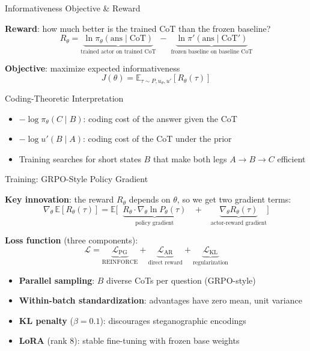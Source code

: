 \documentclass[aspectratio=169]{beamer}
\begin{document}
\begin{frame}{Informativeness Objective \& Reward}

\textbf{Reward}: how much better is the trained CoT than the frozen baseline?
\[
R_\theta = \underbrace{\ln \pi_\theta(\text{ans} \mid \text{CoT})}_{\text{trained actor on trained CoT}}
          \;-\; \underbrace{\ln \pi'(\text{ans} \mid \text{CoT}')}_{\text{frozen baseline on baseline CoT}}
\]

\textbf{Objective}: maximize expected informativeness
\[
J(\theta) = \mathbb{E}_{\tau \sim P, u_\theta, u'}[R_\theta(\tau)]
\]

\begin{block}{Coding-Theoretic Interpretation}
\begin{itemize}
    \item $-\log \pi_\theta(C \mid B)$: coding cost of the answer given the CoT
    \item $-\log u'(B \mid A)$: coding cost of the CoT under the prior
    \item Training searches for short states $B$ that make both legs $A \to B \to C$ efficient
\end{itemize}
\end{block}
\end{frame}

\begin{frame}{Training: GRPO-Style Policy Gradient}

\textbf{Key innovation}: the reward $R_\theta$ depends on $\theta$, so we get two gradient terms:
\[
\nabla_\theta\, \mathbb{E}[R_\theta(\tau)]
= \mathbb{E}\!\Big[\;\;\underbrace{R_\theta \cdot \nabla_\theta \ln P_\theta(\tau)}_{\text{policy gradient}}
  \;\;\;+\;\;\; \underbrace{\nabla_\theta R_\theta(\tau)}_{\text{actor-reward gradient}}\Big]
\]
\vspace{-0.35cm}

\textbf{Loss function} (three components):
\[
\mathcal{L} = \underbrace{\mathcal{L}_{\text{PG}}}_{\text{REINFORCE}} + \underbrace{\mathcal{L}_{\text{AR}}}_{\text{direct reward}} + \underbrace{\mathcal{L}_{\text{KL}}}_{\text{regularization}}
\]
\vspace{-0.25cm}

\begin{itemize}
    \itemsep 0.2em
    \item \textbf{Parallel sampling}: $B$ diverse CoTs per question (GRPO-style)
    \item \textbf{Within-batch standardization}: advantages have zero mean, unit variance
    \item \textbf{KL penalty} ($\beta = 0.1$): discourages steganographic encodings
    \item \textbf{LoRA} (rank 8): stable fine-tuning with frozen base weights
\end{itemize}
\end{frame}
\end{document}
